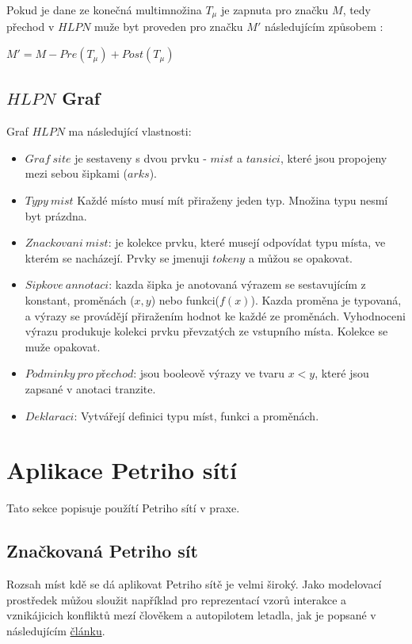 Pokud je dane ze konečná multimnožina $T_\mu$ je zapnuta pro značku $M$, tedy přechod v $HLPN$ muže byt proveden pro značku $M'$ následujícím způsobem \cite[p.~12]{pnstd54}:
\begin{center}
  $M' = M - Pre(T_\mu) + Post(T_\mu)$
\end{center}


\subsection{$HLPN$ Graf}
\label{subsec:hlpn-graph}

Graf $HLPN$ ma následující vlastnosti:
\begin{itemize}
  \item $Graf\:site$ je sestaveny s dvou prvku - $mist$ a $tansici$, které jsou propojeny mezi sebou šipkami ($arks$).
  \item $Typy\:mist$ Každé místo musí mít přiraženy jeden typ. Množina typu nesmí byt prázdna.
  \item $Znackovani\:mist$: je kolekce prvku, které musejí odpovídat typu místa, ve kterém se nacházejí. Prvky se jmenuji $tokeny$ a můžou se opakovat.
  \item $Sipkove\:annotaci$: kazda šipka je anotovaná výrazem se sestavujícím z konstant, proměnách ($x, y$) nebo funkci($f(x)$). Kazda proměna je typovaná, a výrazy se provádějí přiražením hodnot ke každé ze proměnách. Vyhodnoceni výrazu produkuje kolekci prvku převzatých ze vstupního místa. Kolekce se muže opakovat.
  \item $Podminky\:pro\:přechod$: jsou booleově výrazy ve tvaru $x < y$, které jsou zapsané v anotaci tranzite.
  \item $Deklaraci$: Vytvářejí definici typu míst, funkci a proměnách.
\end{itemize}

\section{Aplikace Petriho sítí}
Tato sekce popisuje použítí Petriho sítí v praxe.

\subsection{Značkovaná Petriho sít}
Rozsah míst kdě se dá aplikovat Petriho sítě je velmi široký. Jako modelovací prostředek můžou sloužit například pro reprezentací vzorů interakce a vznikájicich konfliktů mezí člověkem a autopilotem letadla, jak je popsané v následujícím \href{https://www-tandfonline-com.ezproxy.lib.vutbr.cz/doi/full/10.1080/00140139.2013.877597}{článku}.

